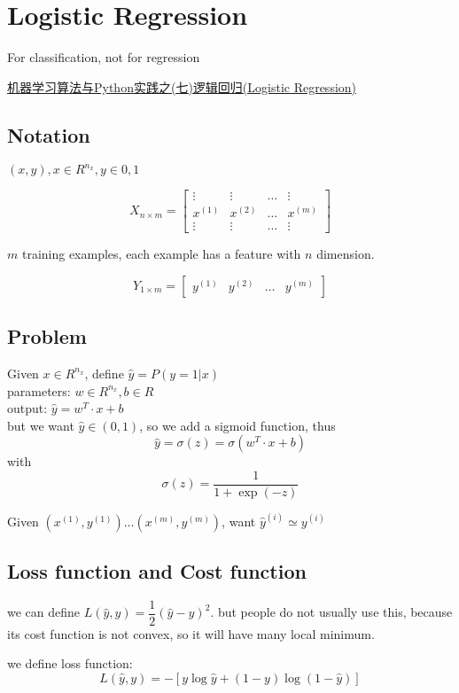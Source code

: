 \section{Logistic Regression}
For classification, not for regression

\href{http://blog.csdn.net/zouxy09/article/details/20319673}{机器学习算法与Python实践之(七)逻辑回归(Logistic Regression)}

\subsection{Notation}
$(x, y), x \in R^{n_x}, y \in {0, 1}$

$$
X_{n \times m} =
\begin{bmatrix}
	\vdots & \vdots & \ldots & \vdots \\
	x^{(1)} & x^{(2)} & \ldots & x^{(m)} \\
	\vdots & \vdots & \ldots & \vdots
\end{bmatrix}
$$

$m$ training examples, each example has a feature with $n$ dimension.

$$
Y_{1 \times m} =
\begin{bmatrix}
	y^{(1)} & y^{(2)} & \ldots & y^{(m)}
\end{bmatrix}
$$

\subsection{Problem}
Given $x \in R^{n_x}$, define $\hat{y} = P(y = 1 | x)$ \\
parameters: $w \in R^{n_x}, b \in R$ \\
output: $\hat{y} = w^{T} \cdot x + b$ \\
but we want $\hat{y} \in (0, 1)$, so we add a sigmoid function, thus $$\hat{y} = \sigma(z) = \sigma(w^T \cdot x + b)$$ with $$\sigma(z) = \dfrac{1}{1 + \exp(-z)}$$

Given ${(x^{(1)}, y^{(1)}) \ldots (x^{(m)}, y^{(m)})}$, want $\hat{y}^{(i)} \simeq y^{(i)}$

\subsection{Loss function and Cost function}
we can define $L(\hat{y}, y) = \dfrac{1}{2} (\hat{y} - y)^2$.
but people do not usually use this, because its cost function is not convex, so it will have many local minimum.

we define loss function: $$L(\hat{y}, y) = -[y \log \hat{y} + (1 - y) \log (1 - \hat{y})]$$

